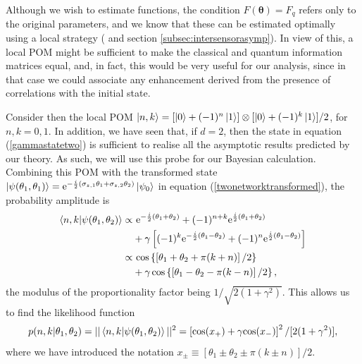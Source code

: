 Although we wish to estimate functions, the condition $F(\boldsymbol{\theta})=F_q$ refers only to the original parameters, and we know that these can be estimated optimally using a local strategy (\cite{proctor2017networked, proctor2017networkedshort} and section \ref{subsec:intersensorasymp}). In view of this, a local POM might be sufficient to make the classical and quantum information matrices equal, and, in fact, this would be very useful for our analysis, since in that case we could associate any enhancement derived from the presence of correlations with the initial state. 

Consider then the local POM $\ket{n, k} = \left[\ket{0} + (-1)^n \ket{1}\right]\otimes[\ket{0} + (-1)^k \ket{1}]/2$, for $n, k = 0, 1$. In addition, we have seen that, if $d=2$, then the state in equation (\ref{gammastatetwo}) is sufficient to realise all the asymptotic results predicted by our theory. As such, we will use this probe for our Bayesian calculation. Combining this POM with the transformed state $\ket{\psi(\theta_1, \theta_1)} = \mathrm{e}^{-\frac{i}{2}(\sigma_{z,1}\theta_1+\sigma_{z,2}\theta_2)}\ket{\psi_0}$ in equation (\ref{twonetworktransformed}), the probability amplitude is
\begin{align}
\braket{n,k}{\psi(\theta_1, \theta_2)}  \propto &~ \mathrm{e}^{-\frac{i}{2}(\theta_1+\theta_2)} + (-1)^{n+k}\mathrm{e}^{\frac{i}{2}(\theta_1+\theta_2)}
\nonumber \\
&+\gamma\left[(-1)^k \mathrm{e}^{-\frac{i}{2}(\theta_1-\theta_2)} + (-1)^n \mathrm{e}^{\frac{i}{2}(\theta_1-\theta_2)}\right]
\nonumber \\
\propto &~ \mathrm{cos}\left\lbrace\left[\theta_1 + \theta_2 + \pi(k+n)\right]/2\right\rbrace
\nonumber \\
&+ \gamma\hspace{0.15em}\mathrm{cos}\left\lbrace\left[\theta_1 - \theta_2 - \pi(k-n)\right]/2\right\rbrace,
\end{align}
the modulus of the proportionality factor being $1/\sqrt{2(1+\gamma^2)}$. This allows us to find the likelihood function
\begin{equation}
p(n, k | \theta_1, \theta_2) = ||\braket{n,k}{\psi(\theta_1, \theta_2)}||^2 = \left[\mathrm{cos}(x_{+}) + \gamma \mathrm{cos}(x_{-})\right]^2/[2(1+\gamma^2)],
\label{multilikelihood}
\end{equation}
where we have introduced the notation $x_{\pm} \equiv \left[\theta_1 \pm \theta_2 \pm \pi(k\pm n)\right]/2$.

